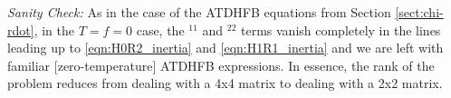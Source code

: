 \noindent\textit{Sanity Check:} As in the case of the ATDHFB equations from Section \ref{sect:chi-rdot}, in the $T=f=0$ case, the $^{11}$ and $^{22}$ terms vanish completely in the lines leading up to \ref{eqn:H0R2_inertia} and \ref{eqn:H1R1_inertia} and we are left with familiar [zero-temperature] ATDHFB expressions. In essence, the rank of the problem reduces from dealing with a 4x4 matrix to dealing with a 2x2 matrix.



